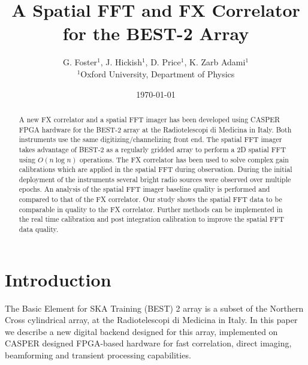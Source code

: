 \documentclass[useAMS,macros,usenatbib,onecolumn]{mn2e}
\title[]{A Spatial FFT and FX Correlator for the BEST-2 Array}
\author[G. Foster, J. Hickish, D. Price and K. Zarb Adami]{G. Foster$^{1}$, J. Hickish$^{1}$, D. Price$^{1}$, K. Zarb Adami$^{1}$\\
$^{1}$Oxford University, Department of Physics}
\begin{document}
\date{\today}

\pagerange{\pageref{firstpage}--\pageref{lastpage}} 

\maketitle

\begin{abstract}
A new FX correlator and a spatial FFT imager has been developed using CASPER FPGA hardware for the BEST-2 array at the Radiotelescopi di Medicina in Italy.
Both instruments use the same digitizing/channelizing front end.
The spatial FFT imager takes advantage of BEST-2 as a regularly gridded array to perform a 2D spatial FFT using $O(n \log n)$ operations.
The FX correlator has been used to solve complex gain calibrations which are applied in the spatial FFT during observation.
During the initial deployment of the instruments several bright radio sources were observed over multiple epochs.
An analysis of the spatial FFT imager baseline quality is performed and compared to that of the FX correlator.
Our study shows the spatial FFT data to be comparable in quality to the FX correlator.
Further methods can be implemented in the real time calibration and post integration calibration to improve the spatial FFT data quality.
\end{abstract}

\section{Introduction}

The Basic Element for SKA Training (BEST) 2 array is a subset of the Northern Cross cylindrical array, at the Radiotelescopi di Medicina in Italy.
In this paper we describe a new digital backend designed for this array, implemented on CASPER \citep{casper} designed FPGA-based hardware for fast correlation, direct imaging, beamforming and transient processing capabilities.
\end{document}
